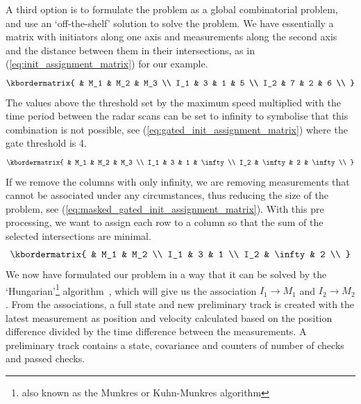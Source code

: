A third option is to formulate the problem as a global combinatorial problem, and use an `off-the-shelf' solution to solve the problem. We have essentially a matrix with initiators along one axis and measurements along the second axis and the distance between them in their intersections, as in (\ref{eq:init_assignment_matrix}) for our example.
\begin{equation}\label{eq:init_assignment_matrix}
\kbordermatrix{
	 	& M_1 	& M_2 	& M_3	\\
    I_1 & 3 	& 1 	& 5 	\\
    I_2 & 7 	& 2 	& 6		\\
}
\end{equation}
The values above the threshold set by the maximum speed multiplied with the time period between the radar scans can be set to infinity to symbolise that this combination is not possible, see (\ref{eq:gated_init_assignment_matrix}) where the gate threshold is 4.
\begin{equation}\label{eq:gated_init_assignment_matrix}
\kbordermatrix{
	 	& M_1 		& M_2 	& M_3		\\
    I_1 & 3 		& 1 	& \infty 	\\
    I_2 & \infty 	& 2 	& \infty	\\
}
\end{equation}
If we remove the columns with only infinity, we are removing measurements that cannot be associated under any circumstances, thus reducing the size of the problem, see (\ref{eq:masked_gated_init_assignment_matrix}). With this pre processing, we want to assign each row to a column so that the sum of the selected intersections are minimal. 
\begin{equation}\label{eq:masked_gated_init_assignment_matrix}
\kbordermatrix{
	 	& M_1 		& M_2	\\
    I_1 & 3 		& 1  	\\ 
    I_2 & \infty 	& 2 	\\
}
\end{equation}
We now have formulated our problem in a way that it can be solved by the `Hungarian'\footnote{also known as the Munkres or Kuhn-Munkres algorithm} algorithm~\cite{Munkres1957}, which will give us the association \(I_1 \rightarrow M_1\) and \(I_2 \rightarrow M_2\). From the associations, a full state and new preliminary track is created with the latest measurement as position and velocity calculated based on the position difference divided by the time difference between the measurements. A preliminary track contains a state, covariance and counters of number of checks and passed checks.

